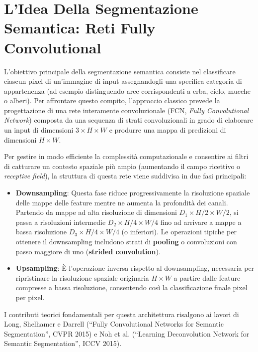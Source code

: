 ﻿\documentclass[11pt, a4paper]{article}
\begin{document}
\section{L'Idea Della Segmentazione Semantica: Reti Fully Convolutional}

L'obiettivo principale della segmentazione semantica consiste nel classificare ciascun pixel di un'immagine di input assegnandogli una specifica categoria di appartenenza (ad esempio distinguendo aree corrispondenti a erba, cielo, mucche o alberi). Per affrontare questo compito, l'approccio classico prevede la progettazione di una rete interamente convoluzionale (FCN, \emph{Fully Convolutional Network}) composta da una sequenza di strati convoluzionali in grado di elaborare un input di dimensioni $3 \times H \times W$ e produrre una mappa di predizioni di dimensioni $H \times W$.


Per gestire in modo efficiente la complessità computazionale e consentire ai filtri di catturare un contesto spaziale più ampio (aumentando il campo ricettivo o \emph{receptive field}), la struttura di questa rete viene suddivisa in due fasi principali:

\begin{itemize}[noitemsep]
    \item \textbf{Downsampling}: Questa fase riduce progressivamente la risoluzione spaziale delle mappe delle feature mentre ne aumenta la profondità dei canali. Partendo da mappe ad alta risoluzione di dimensioni $D_1 \times H/2 \times W/2$, si passa a risoluzioni intermedie $D_2 \times H/4 \times W/4$ fino ad arrivare a mappe a bassa risoluzione $D_3 \times H/4 \times W/4$ (o inferiori). Le operazioni tipiche per ottenere il downsampling includono strati di \textbf{pooling} o convoluzioni con passo maggiore di uno (\textbf{strided convolution}).
    \item \textbf{Upsampling}: È l'operazione inversa rispetto al downsampling, necessaria per ripristinare la risoluzione spaziale originaria $H \times W$ a partire dalle feature compresse a bassa risoluzione, consentendo così la classificazione finale pixel per pixel.
\end{itemize}

I contributi teorici fondamentali per questa architettura risalgono ai lavori di Long, Shelhamer e Darrell (``Fully Convolutional Networks for Semantic Segmentation'', CVPR 2015) e Noh et al. (``Learning Deconvolution Network for Semantic Segmentation'', ICCV 2015).
\end{document}
